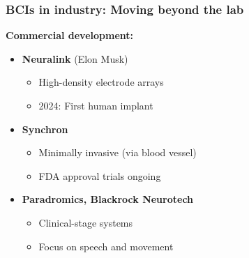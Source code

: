 \documentclass[slidestop,compress,mathserif]{beamer}
\begin{document}
\begin{frame}
\frametitle{BCIs in industry: Moving beyond the lab}

\textbf{Commercial development:}

\small
\begin{itemize}
\setlength\itemsep{0.3em}
\item \textbf{Neuralink} (Elon Musk)
\begin{itemize}
\scriptsize
\item High-density electrode arrays
\item 2024: First human implant
\end{itemize}

\item \textbf{Synchron}
\begin{itemize}
\scriptsize
\item Minimally invasive (via blood vessel)
\item FDA approval trials ongoing
\end{itemize}

\item \textbf{Paradromics, Blackrock Neurotech}
\begin{itemize}
\scriptsize
\item Clinical-stage systems
\item Focus on speech and movement
\end{itemize}
\end{itemize}





\end{frame}
\end{document}
